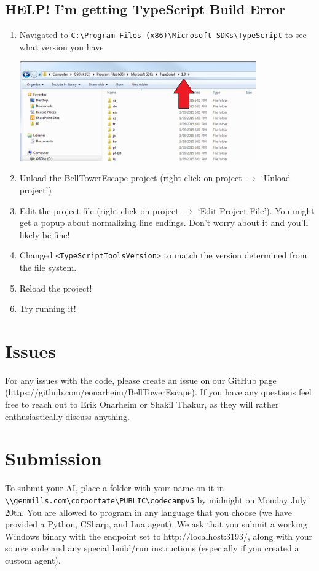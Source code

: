 \documentclass{article}
\begin{document}
\subsection*{HELP! I'm getting TypeScript Build Error}
\begin{enumerate}
	\item Navigated to \verb|C:\Program Files (x86)\Microsoft SDKs\TypeScript| to see what version you have

	\includegraphics[width=4in]{typescript.png}
	\item Unload the BellTowerEscape project (right click on project $\to$ `Unload project')
	\item Edit the project file (right click on project $\to$ `Edit Project File'). You might get a popup about normalizing line endings. Don't worry about it and you'll likely be fine!
	\item Changed \verb|<TypeScriptToolsVersion>| to match the version determined from the file system.
	\item Reload the project!
	\item Try running it!
\end{enumerate}

\section*{Issues}
For any issues with the code, please create an issue on our GitHub page (https://github.com/eonarheim/BellTowerEscape). If you have any questions feel free to reach out to Erik Onarheim or Shakil Thakur, as they will rather enthusiastically discuss anything.

\section*{Submission}
To submit your AI, place a folder with your name on it in \verb|\\genmills.com\corportate\PUBLIC\codecampv5| by midnight on Monday July 20th. You are allowed to program in any language that you choose (we have provided a Python, CSharp, and Lua agent). We ask that you submit a working Windows binary with the endpoint set to http://localhost:3193/, along with your source code and any special build/run instructions (especially if you created a custom agent).
\end{document}
